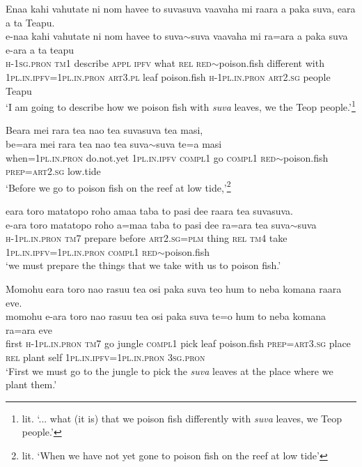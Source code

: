\ea\label{ex:text29-1}
Enaa kahi vahutate ni nom havee to suvasuva vaavaha mi raara a paka suva, eara a ta Teapu.\\
\gll e-naa	kahi	vahutate	ni	nom	havee	to	suva{$\sim$}suva	vaavaha	mi	ra=ara	a	paka	suva	e-ara	a	ta	teapu\\
     \textsc{h}-1\textsc{sg}.\textsc{pron}	\textsc{tm}1	describe	\textsc{appl}	\textsc{ipfv}	what	\textsc{rel}	\textsc{red}{$\sim$}poison.fish	different	with	1\textsc{pl}.\textsc{in}.\textsc{ipfv}=1\textsc{pl}.\textsc{in}.\textsc{pron}	\textsc{art}3.\textsc{pl}	leaf	poison.fish	\textsc{h}-1\textsc{pl}.\textsc{in}.\textsc{pron}	\textsc{art}2.\textsc{sg}	people	Teapu\\
\glt `I am going to describe how we poison fish with \textit{suva} leaves, we the Teop people.'\footnote{lit. `... what (it is) that we poison fish differently with \textit{suva} leaves, we Teop people.'}
\z

\ea\label{ex:text29-2}
Beara mei rara tea nao tea suvasuva tea masi,\\
\gll be=ara	mei	rara	tea	nao	tea	suva{$\sim$}suva	te=a	masi\\
     when=1\textsc{pl}.\textsc{in}.\textsc{pron}	do.not.yet	1\textsc{pl}.\textsc{in}.\textsc{ipfv}	\textsc{compl}1	go	\textsc{compl}1	\textsc{red}{$\sim$}poison.fish	\textsc{prep}=\textsc{art}2.\textsc{sg}	low.tide\\
\glt `Before we go to poison fish on the reef at low tide,'\footnote{lit. `When we have not yet gone to poison fish on the reef at low tide'}
\z

\ea\label{ex:text29-3}
eara toro matatopo roho amaa taba to pasi dee raara tea suvasuva.\\
\gll e-ara	toro	matatopo	roho	a=maa	taba	to	pasi	dee	ra=ara	tea	suva{$\sim$}suva\\
     \textsc{h}-1\textsc{pl}.\textsc{in}.\textsc{pron}	\textsc{tm}7	prepare	before	\textsc{art}2.\textsc{sg}=\textsc{plm}	thing	\textsc{rel}	\textsc{tm}4	take	1\textsc{pl}.\textsc{in}.\textsc{ipfv}=1\textsc{pl}.\textsc{in}.\textsc{pron}	\textsc{compl}1	\textsc{red}{$\sim$}poison.fish\\
\glt `we must prepare the things that we take with us to poison fish.'
\z

\ea\label{ex:text29-4}
Momohu eara toro nao rasuu tea osi paka suva teo hum to neba komana raara eve.\\
\gll momohu	e-ara	toro	nao	rasuu	tea	osi	paka	suva	te=o	hum	to	neba	komana	ra=ara	eve\\
     first	\textsc{h}-1\textsc{pl}.\textsc{in}.\textsc{pron}	\textsc{tm}7	go	jungle	\textsc{compl}1	pick	leaf	poison.fish	\textsc{prep}=\textsc{art}3.\textsc{sg}	place	\textsc{rel}	plant	self	1\textsc{pl}.\textsc{in}.\textsc{ipfv}=1\textsc{pl}.\textsc{in}.\textsc{pron}	3\textsc{sg}.\textsc{pron}\\
\glt `First we must go to the jungle to pick the \textit{suva} leaves at the place where we plant them.'
\z

